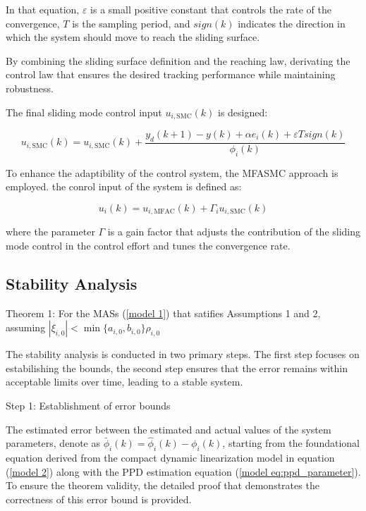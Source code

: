 \documentclass[journal,onecolumn]{IEEEtran}
\begin{document}
In that equation, \(\varepsilon\) is a small positive constant that controls the rate of the convergence, \(T\) is the sampling period, and \(sign(k)\) indicates the direction in which the system should move to reach the sliding surface.

By combining the sliding surface definition and the reaching law, derivating the control law that ensures the desired tracking performance while maintaining robustness.

The final sliding mode control input \(u_{i,\text{SMC}}(k)\) is designed:

\begin{equation}
    \label{model eq:smc}
    u_{i,\text{SMC}}(k) = u_{i,\text{SMC}}(k) + \frac{y_d(k+1)-y(k) + \alpha e_i(k) + \varepsilon T sign(k)}{\phi_i(k)}
\end{equation}

To enhance the  adaptibility of the control system, the MFASMC approach is employed.  the conrol input of the system is defined as:

\begin{equation}
    \label{model eq:mfasmc}
    u_i(k) = u_{i,\text{MFAC}}(k) + \Gamma_i  u_{i,\text{SMC}}(k)
\end{equation}

where the parameter \(\Gamma\) is a gain factor that adjusts the contribution of the sliding mode control in the control effort and tunes the convergence rate.

\subsection{Stability Analysis}

Theorem 1: For the MASs (\ref{model 1}) that satifies Assumptions 1 and 2, assuming $ |\xi_{i,0}| < \min\{a_{i,0}, b_{i,0}\} \rho_{i,0} $

The stability analysis is conducted in two primary steps. The first step focuses on estabilishing the bounds, the second step ensures that the error remains within acceptable limits over time, leading to a stable system.

Step 1: Establishment of error bounds

The estimated error between the estimated and actual values of the system parameters, denote as \(\tilde{\phi_i}(k)
=\hat{\phi}_i(k)-\phi_i(k) \), starting from the foundational equation derived from the compact dynamic linearization model in equation (\ref{model 2}) along with the PPD estimation equation (\ref{model eq:ppd_parameter}). To ensure the theorem validity, the detailed proof that demonstrates the correctness of this error bound is provided.
\end{document}
